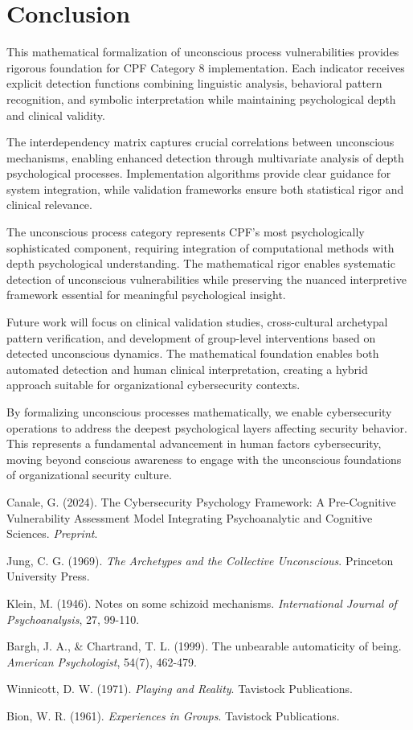 \documentclass[11pt,a4paper]{article}
\begin{document}
\section{Conclusion}

This mathematical formalization of unconscious process vulnerabilities provides rigorous foundation for CPF Category 8 implementation. Each indicator receives explicit detection functions combining linguistic analysis, behavioral pattern recognition, and symbolic interpretation while maintaining psychological depth and clinical validity.

The interdependency matrix captures crucial correlations between unconscious mechanisms, enabling enhanced detection through multivariate analysis of depth psychological processes. Implementation algorithms provide clear guidance for system integration, while validation frameworks ensure both statistical rigor and clinical relevance.

The unconscious process category represents CPF's most psychologically sophisticated component, requiring integration of computational methods with depth psychological understanding. The mathematical rigor enables systematic detection of unconscious vulnerabilities while preserving the nuanced interpretive framework essential for meaningful psychological insight.

Future work will focus on clinical validation studies, cross-cultural archetypal pattern verification, and development of group-level interventions based on detected unconscious dynamics. The mathematical foundation enables both automated detection and human clinical interpretation, creating a hybrid approach suitable for organizational cybersecurity contexts.

By formalizing unconscious processes mathematically, we enable cybersecurity operations to address the deepest psychological layers affecting security behavior. This represents a fundamental advancement in human factors cybersecurity, moving beyond conscious awareness to engage with the unconscious foundations of organizational security culture.

\begin{thebibliography}{9}

Canale, G. (2024). The Cybersecurity Psychology Framework: A Pre-Cognitive Vulnerability Assessment Model Integrating Psychoanalytic and Cognitive Sciences. \textit{Preprint}.

Jung, C. G. (1969). \textit{The Archetypes and the Collective Unconscious}. Princeton University Press.

Klein, M. (1946). Notes on some schizoid mechanisms. \textit{International Journal of Psychoanalysis}, 27, 99-110.

Bargh, J. A., \& Chartrand, T. L. (1999). The unbearable automaticity of being. \textit{American Psychologist}, 54(7), 462-479.

Winnicott, D. W. (1971). \textit{Playing and Reality}. Tavistock Publications.

Bion, W. R. (1961). \textit{Experiences in Groups}. Tavistock Publications.

\end{thebibliography}
\end{document}
